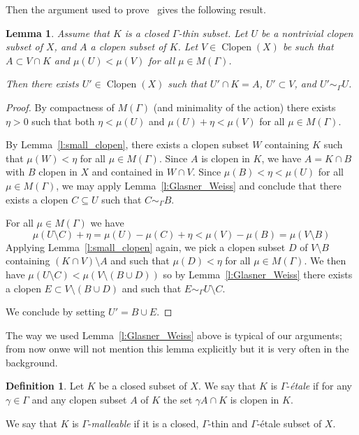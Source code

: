\documentclass[10pt,a4paper]{article}
\newtheorem{lemm}[theo]{Lemma}
\theoremstyle{definition}
\newtheorem{defi}[theo]{Definition}
\DeclareMathOperator{\Clopen}{Clopen}
\begin{document}
Then the argument used to prove~\cite[Lemma~3.13]{Melleray2023} gives the following result.

\begin{lemm}\label{l:compatible_clopen}
Assume that $K$ is a closed $\Gamma$-thin subset. Let $U$ be a nontrivial clopen subset of $X$, and $A$ a clopen subset of $K$. Let $V \in \Clopen(X)$ be such that $A \subset V \cap K$ and $\mu(U)< \mu(V)$ for all $\mu \in M(\Gamma)$.

Then there exists $U' \in \Clopen(X)$ such that $U' \cap K =A$, $U' \subset V$, and $U' \sim_\Gamma U$.
\end{lemm}

\begin{proof}
By compactness of $M(\Gamma)$ (and minimality of the action) there exists $\eta >0$ such that both $\eta < \mu(U)$ and $\mu(U)+ \eta < \mu(V)$ for all $\mu \in M(\Gamma)$.

By Lemma~\ref{l:small_clopen}, there exists a clopen subset $W$ containing $K$ such that $\mu(W)< \eta$ for all $\mu \in M(\Gamma)$. Since $A$ is clopen in $K$, we have $A=K \cap B$ with $B$ clopen in $X$ and contained in $W \cap V$. Since $\mu(B) < \eta < \mu(U)$ for all $\mu \in M(\Gamma)$, we may apply Lemma~\ref{l:Glasner_Weiss} and conclude that there exists a clopen $C \subseteq U$ such that $C \sim_\Gamma B$.

For all $\mu \in M(\Gamma)$ we have
\[
\mu(U \setminus C) +\eta = \mu(U) - \mu(C) + \eta < \mu(V)-\mu(B) = \mu(V \setminus B)
\]
Applying Lemma~\ref{l:small_clopen} again, we pick a clopen subset $D$ of $V \setminus B$ containing $(K \cap V) \setminus A$ and such that $\mu(D)< \eta$ for all $\mu \in M(\Gamma)$. We then have $\mu(U \setminus C) < \mu(V \setminus (B \cup D))$ so by Lemma~\ref{l:Glasner_Weiss} there exists a clopen $E \subset V \setminus (B \cup D)$ and such that $E \sim_\Gamma U\setminus C$.

We conclude by setting $U'=B \cup E$.
\end{proof}

The way we used Lemma~\ref{l:Glasner_Weiss} above is typical of our arguments; from now on\linebreak we will not mention this lemma explicitly but it is very often in the background.

\begin{defi}
Let $K$ be a closed subset of $X$. We say that $K$ is $\Gamma$-\emph{étale} if for any $\gamma \in \Gamma$ and any clopen subset $A$ of $K$ the set $\gamma A \cap K$ is clopen in $K$.

We say that $K$ is $\Gamma$-\emph{malleable} if it is a closed, $\Gamma$-thin and $\Gamma$-étale subset of $X$.
\end{defi}
\end{document}
